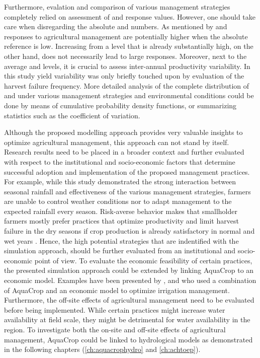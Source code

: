 Furthermore, evalation and comparison of various management strategies completely relied on assessment of \Y and \WPET response values. However, one should take care when disregarding the absolute \Y and \WPET numbers. As mentioned by \textcite{rockstrom2007} \Y and \WPET responses to agricultural management are potentially higher when the absolute reference \Y is low. Increasing \Y from a level that is already substantially high, on the other hand, does not necessarily lead to large \WPET responses. Moreover, next to the average \Y and \WPET levels, it is crucial to assess inter-annual productivity variability. In this study yield variability was only briefly touched upon by evaluation of the harvest failure frequency. More detailed analysis of the complete distribution of \Y and \WPET under various management strategies and environmental conditions could be done by means of cumulative probability density functions, or summarizing statistics such as the coefficient of variation. 

Although the proposed modelling approach provides very valuable insights to optimize agricultural management, this approach can not stand by itself. Research results need to be placed in a broader context and further evaluated with respect to the institutional and socio-economic factors that determine successful adoption and implementation of the proposed management practices.
For example, while this study demonstrated the strong interaction between seasonal rainfall and effectiveness of the various management strategies, farmers are unable to control weather conditions nor to adapt management to the expected rainfall every season. Risk-averse behavior makes that smallholder farmers mostly prefer practices that optimize productivity and limit harvest failure in the dry seasons if crop production is already satisfactory in normal and wet years \parencite{kijne2009}. Hence, the high potential strategies that are indentified with the simulation approach, should be further evaluated from an institutional and socio-economic point of view. To evaluate the economic feasibility of certain practices, the presented simulation approach could be extended by linking AquaCrop to an economic model. Examples have been presented by \textcite{garciavila2009}, \textcite{garciavila2012} and \textcite{cusicanqui2013} who used a combination of AquaCrop and an economic model to optimize irrigation management. Furthermore, the off-site effects of agricultural management need to be evaluated before being implemented. While certain practices might increase water availability at field scale, they might be detrimental for water availability in the region. To investigate both the on-site and off-site effects of agricultural management, AquaCrop could be linked to hydrological models as demonstrated in the following chapters (\autoref{ch:aquacrophydro} and \autoref{ch:achtoep}).

